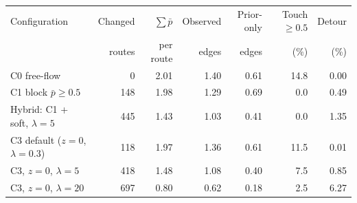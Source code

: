 \begin{tabular}{lrrrrrr}
\toprule
Configuration & Changed & $\sum\bar p$ & Observed & Prior-only & Touch $\ge0.5$ & Detour\\
 & routes & per route & edges & edges & (\%) & (\%)\\
\midrule
C0 free-flow & 0 & 2.01 & 1.40 & 0.61 & 14.8 & 0.00\\
C1 block $\bar p\ge0.5$ & 148 & 1.98 & 1.29 & 0.69 & 0.0 & 0.49\\
Hybrid: C1 + soft, $\lambda=5$ & 445 & 1.43 & 1.03 & 0.41 & 0.0 & 1.35\\
C3 default ($z=0$, $\lambda=0.3$) & 118 & 1.97 & 1.36 & 0.61 & 11.5 & 0.01\\
C3, $z=0$, $\lambda=5$ & 418 & 1.48 & 1.08 & 0.40 & 7.5 & 0.85\\
C3, $z=0$, $\lambda=20$ & 697 & 0.80 & 0.62 & 0.18 & 2.5 & 6.27\\
\bottomrule
\end{tabular}

